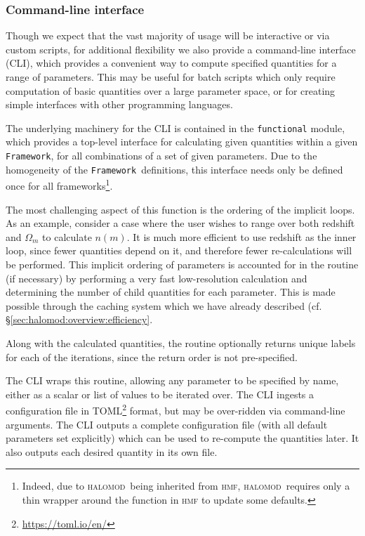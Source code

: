 \documentclass[5p,aas_macros]{elsarticle}
\newcommand{\halomod}{\textsc{halomod}\xspace} %
\newcommand{\framework}{\texttt{Framework}\xspace} %
\begin{document}
\subsubsection{Command-line interface}
\label{sec:halomod:extra:cli}
Though we expect that the vast majority of usage will be interactive or via custom scripts, for additional flexibility we also provide a command-line interface (CLI), which provides a convenient way to compute specified quantities for a range of parameters. This may be useful for batch scripts which only require computation of basic quantities over a large parameter space, or for creating simple interfaces with other programming languages. 

The underlying machinery for the CLI is contained in the \verb|functional| module, which provides a top-level interface for calculating given quantities within a given \framework, for all combinations of a set of given parameters. Due to the homogeneity of the \framework\ definitions, this interface needs only be defined once for all frameworks\footnote{Indeed, due to \halomod\  being inherited from \textsc{hmf}, \halomod\  requires only a thin wrapper around the function in \textsc{hmf} to update some defaults.}. 

The most challenging aspect of this function is the ordering of the implicit loops. As an example, consider a case where the user wishes to range over both redshift and $\Omega_m$ to calculate $n(m)$. It is much more efficient to use redshift as the inner loop, since fewer quantities depend on it, and therefore fewer re-calculations will be performed. This implicit ordering of parameters is accounted for in the routine (if necessary) by performing a very fast low-resolution calculation and determining the number of child quantities for each parameter. This is made possible through the caching system which we have already described (cf. \S\ref{sec:halomod:overview:efficiency}.

Along with the calculated quantities, the routine optionally returns unique labels for each of the iterations, since the return order is not pre-specified.

The CLI wraps this routine, allowing any parameter to be specified by name, either as a scalar or list of values to be iterated over. The CLI ingests a configuration file in \textsc{TOML}\footnote{\url{https://toml.io/en/}} format, but may be over-ridden via command-line arguments. The CLI outputs a complete configuration file (with all default parameters set explicitly) which can be used to re-compute the quantities later. It also outputs each desired quantity in its own file. 
\end{document}
